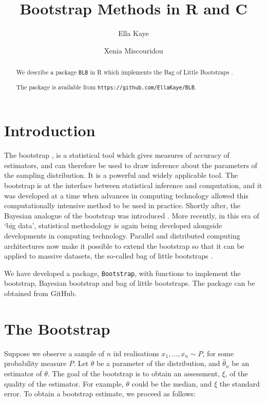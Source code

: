 \documentclass{article}
\title{Bootstrap Methods in R and C}
\author{Ella Kaye \and Xenia Miscouridou}
\begin{document}


\maketitle

\begin{abstract}
We describe a package \texttt{BLB} in R which implements the Bag of Little Bootstraps \parencite{Kleiner2014}.

The package is available from \texttt{https://github.com/EllaKaye/BLB}.
\end{abstract}

\section{Introduction}
The bootstrap \parencite{Efron1979}, is a statistical tool which gives measures of accuracy of estimators, and can therefore be used to draw inference about the parameters of the sampling distribution. It is a powerful and widely applicable tool. The bootstrap is at the interface between statistical inference and computation, and it was developed at a time when advances in computing technology allowed this computationally intensive method to be used in practice. Shortly after, the Bayesian analogue of the bootstrap was introduced \parencite{Rubin1981}. More recently, in this era of `big data', statistical methodology is again being developed alongside developments in computing technology. Parallel and distributed computing architectures now make it possible to extend the bootstrap so that it can be applied to massive datasets, the so-called bag of little bootstraps \parencite{Kleiner2014}.

We have developed a package, \texttt{Bootstrap}, with functions to implement the bootstrap, Bayesian bootstrap and bag of little bootstraps. The package can be obtained from GitHub.



\section{The Bootstrap}
Suppose we observe a sample of $n$ iid realisations  $x_1,\ldots, x_n \sim P$, for some probability measure $P$. Let $\theta$ be a parameter of the distribution, and $\hat\theta_n$ be an estimator of $\theta$. The goal of the bootstrap is to obtain an assessment, $\xi$, of the quality of the estimator. For example, $\theta$ could be the median, and $\xi$ the standard error. To obtain a bootstrap estimate, we proceed as follows:
\end{document}

